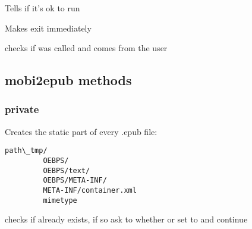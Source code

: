 \documentclass[letterpaper,10pt,english]{sphinxmanual}
\begin{document}

\begin{fulllineitems}
\label{epub:safe__mutable-b}
Tells if it's ok to run {\hyperref[epub:mobi2epub::directory_structureC]{}}

\end{fulllineitems}


\begin{fulllineitems}
\label{epub:no_cleanup__mutable-b}
Makes {\hyperref[epub:mobi2epub::cleanupC]{}} exit immediately

\end{fulllineitems}


\begin{fulllineitems}
\label{epub:vanilla_out__mutable-b}
checks if {\hyperref[epub:mobi2epub::set_out__ssR]{}} was called and {\hyperref[epub:path_out__boost::filesystem::path]{}}
comes from the user

\end{fulllineitems}



\subsection{mobi2epub methods}
\label{epub:mobi2epub-methods}

\subsubsection{private}
\label{epub:id1}

\begin{fulllineitems}
\label{epub:mobi2epub::directory_structureC}
Creates the static part of every .epub file:

\begin{Verbatim}[commandchars=\\\{\}]
path\_tmp/
         OEBPS/
         OEBPS/text/
         OEBPS/META-INF/
         META-INF/container.xml
         mimetype
\end{Verbatim}

checks if already exists, if so ask to whether {\hyperref[epub:mobi2epub::cleanupC]{}}
or set to {\hyperref[epub:safe__mutable-b]{}} and continue

\end{fulllineitems}
\end{document}
